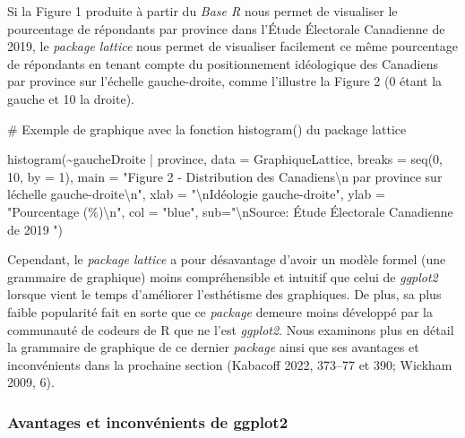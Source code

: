 \documentclass[
  letterpaper,
]{scrbook}
\newenvironment{Shaded}{\begin{snugshade}}{\end{snugshade}}
\newcommand{\AttributeTok}[1]{\textcolor[rgb]{0.40,0.45,0.13}{#1}}
\newcommand{\CommentTok}[1]{\textcolor[rgb]{0.37,0.37,0.37}{#1}}
\newcommand{\DecValTok}[1]{\textcolor[rgb]{0.68,0.00,0.00}{#1}}
\newcommand{\FunctionTok}[1]{\textcolor[rgb]{0.28,0.35,0.67}{#1}}
\newcommand{\NormalTok}[1]{\textcolor[rgb]{0.00,0.23,0.31}{#1}}
\newcommand{\SpecialCharTok}[1]{\textcolor[rgb]{0.37,0.37,0.37}{#1}}
\newcommand{\StringTok}[1]{\textcolor[rgb]{0.13,0.47,0.30}{#1}}
\begin{document}
Si la Figure 1 produite à partir du \emph{Base R} nous permet de
visualiser le pourcentage de répondants par province dans l'Étude
Électorale Canadienne de 2019, le \emph{package lattice} nous permet de
visualiser facilement ce même pourcentage de répondants en tenant compte
du positionnement idéologique des Canadiens par province sur l'échelle
gauche-droite, comme l'illustre la Figure 2 (0 étant la gauche et 10 la
droite).

\begin{Shaded}
\begin{Highlighting}[]
\CommentTok{\# Exemple de graphique avec la fonction histogram() du package lattice}

\FunctionTok{histogram}\NormalTok{(}\SpecialCharTok{\textasciitilde{}}\NormalTok{gaucheDroite }\SpecialCharTok{|}\NormalTok{ province, }\AttributeTok{data =}\NormalTok{ GraphiqueLattice, }\AttributeTok{breaks =} \FunctionTok{seq}\NormalTok{(}\DecValTok{0}\NormalTok{, }\DecValTok{10}\NormalTok{, }
  \AttributeTok{by =} \DecValTok{1}\NormalTok{), }
  \AttributeTok{main =} \StringTok{"Figure 2 {-} Distribution des Canadiens}\SpecialCharTok{\textbackslash{}n}\StringTok{ par province sur l\textquotesingle{}échelle gauche{-}droite}\SpecialCharTok{\textbackslash{}n}\StringTok{"}\NormalTok{,}
  \AttributeTok{xlab =} \StringTok{"}\SpecialCharTok{\textbackslash{}n}\StringTok{Idéologie gauche{-}droite"}\NormalTok{,}
  \AttributeTok{ylab =} \StringTok{"Pourcentage (\%)}\SpecialCharTok{\textbackslash{}n}\StringTok{"}\NormalTok{,}
  \AttributeTok{col  =} \StringTok{"blue"}\NormalTok{,}
  \AttributeTok{sub=}\StringTok{"}\SpecialCharTok{\textbackslash{}n}\StringTok{Source: Étude Électorale Canadienne de 2019                                                "}\NormalTok{)}
\end{Highlighting}
\end{Shaded}

Cependant, le \emph{package lattice} a pour désavantage d'avoir un
modèle formel (une grammaire de graphique) moins compréhensible et
intuitif que celui de \emph{ggplot2} lorsque vient le temps d'améliorer
l'esthétisme des graphiques. De plus, sa plus faible popularité fait en
sorte que ce \emph{package} demeure moins développé par la communauté de
codeurs de R que ne l'est \emph{ggplot2}. Nous examinons plus en détail
la grammaire de graphique de ce dernier \emph{package} ainsi que ses
avantages et inconvénients dans la prochaine section (Kabacoff 2022,
373--77 et 390; Wickham 2009, 6).

\hypertarget{avantages-et-inconvuxe9nients-de-ggplot2}{%
\subsubsection{Avantages et inconvénients de
ggplot2}\label{avantages-et-inconvuxe9nients-de-ggplot2}}
\end{document}
